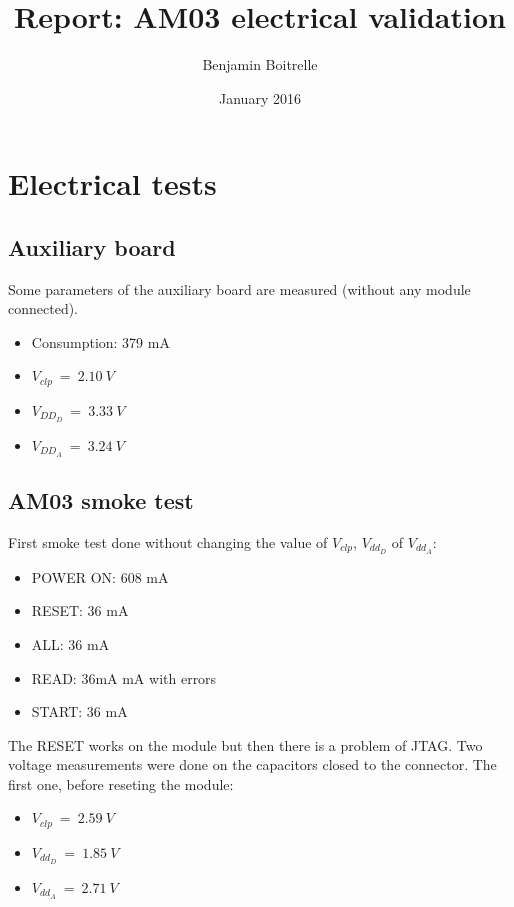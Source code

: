 \documentclass[a4papper, 10pt]{article}
\title{Report: AM03 electrical validation}
\author{Benjamin Boitrelle}
\date{January 2016}
\begin{document}
    \maketitle
    

  \section{Electrical tests}
    \subsection{Auxiliary board}
    
   Some parameters of the auxiliary board are measured (without any module connected).
   \begin{itemize}
     \item Consumption: 379 mA
     \item $V_{clp} \ = \ 2.10 \ V$
     \item $V_{DD_D} \ = \ 3.33 \ V$
     \item $V_{DD_A} \ = \ 3.24 \ V$
   \end{itemize}

     \subsection{AM03 smoke test}

    First smoke test done without changing the value of  $V_{clp}$, $V_{dd_D}$ of $V_{dd_A}$:
     \begin{itemize}
       \item POWER ON: 608 mA
       \item RESET: 36 mA
       \item ALL: 36 mA
       \item READ: 36mA mA with errors
       \item START: 36 mA 
     \end{itemize}

     The RESET works on the module but then there is a problem of JTAG.
     Two voltage measurements were done on the capacitors closed to the connector.
     The first one, before reseting the module:

     \begin{itemize}
       \item $V_{clp} \ = \ 2.59 \ V$ 
       \item $V_{dd_D} \ = \ 1.85 \ V$
       \item $V_{dd_A} \ = \ 2.71 \ V$
     \end{itemize}
\end{document}
